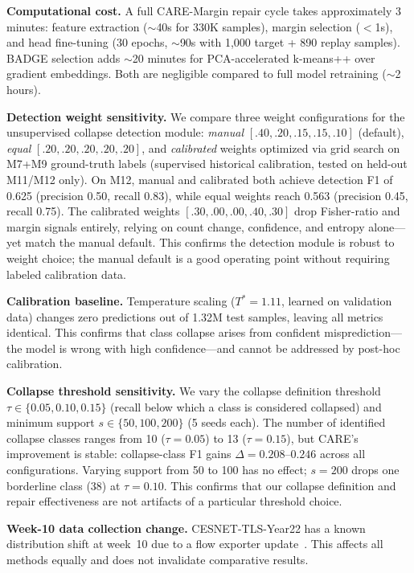 \documentclass[journal]{IEEEtran}
\newcommand{\ours}{CARE}  %
\begin{document}
\textbf{Computational cost.}
A full \ours{}-Margin repair cycle takes approximately 3 minutes: feature extraction (${\sim}$40s for 330K samples), margin selection ($<$1s), and head fine-tuning (30 epochs, ${\sim}$90s with 1{,}000 target + 890 replay samples).
BADGE selection adds ${\sim}$20 minutes for PCA-accelerated k-means++ over gradient embeddings.
Both are negligible compared to full model retraining (${\sim}$2 hours).

\textbf{Detection weight sensitivity.}
We compare three weight configurations for the unsupervised collapse detection module: \textit{manual} $[.40,.20,.15,.15,.10]$ (default), \textit{equal} $[.20,.20,.20,.20,.20]$, and \textit{calibrated} weights optimized via grid search on M7+M9 ground-truth labels (supervised historical calibration, tested on held-out M11/M12 only).
On M12, manual and calibrated both achieve detection F1 of 0.625 (precision 0.50, recall 0.83), while equal weights reach 0.563 (precision 0.45, recall 0.75).
The calibrated weights $[.30,.00,.00,.40,.30]$ drop Fisher-ratio and margin signals entirely, relying on count change, confidence, and entropy alone---yet match the manual default.
This confirms the detection module is robust to weight choice; the manual default is a good operating point without requiring labeled calibration data.

\textbf{Calibration baseline.}
Temperature scaling ($T^*{=}1.11$, learned on validation data) changes zero predictions out of 1.32M test samples, leaving all metrics identical.
This confirms that class collapse arises from confident misprediction---the model is wrong with high confidence---and cannot be addressed by post-hoc calibration.

\textbf{Collapse threshold sensitivity.}
We vary the collapse definition threshold $\tau \in \{0.05, 0.10, 0.15\}$ (recall below which a class is considered collapsed) and minimum support $s \in \{50, 100, 200\}$ (5 seeds each).
The number of identified collapse classes ranges from 10 ($\tau{=}0.05$) to 13 ($\tau{=}0.15$), but \ours{}'s improvement is stable: collapse-class F1 gains $\Delta{=}0.208$--$0.246$ across all configurations.
Varying support from 50 to 100 has no effect; $s{=}200$ drops one borderline class (38) at $\tau{=}0.10$.
This confirms that our collapse definition and repair effectiveness are not artifacts of a particular threshold choice.

\textbf{Week-10 data collection change.}
CESNET-TLS-Year22 has a known distribution shift at week~10 due to a flow exporter update~\cite{hynek2024cesnet}.
This affects all methods equally and does not invalidate comparative results.
\end{document}
